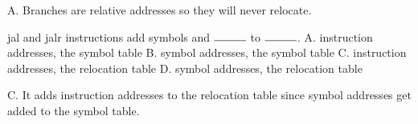 \begin{blocksection}
\begin{parts}
\begin{solution}
    A. Branches are relative addresses so they will never relocate.
\end{solution}

\item
jal and jalr instructions add symbols and $\rule{1cm}{0.15mm}$ to $\rule{1cm}{0.15mm}$. \newline
A. instruction addresses, the symbol table \newline
B. symbol addresses, the symbol table \newline
C. instruction addresses, the relocation table \newline 
D. symbol addresses, the relocation table

\begin{solution}
    C. It adds instruction addresses to the relocation table since symbol addresses get added to the symbol table.
\end{solution}
\end{parts}
\end{blocksection}